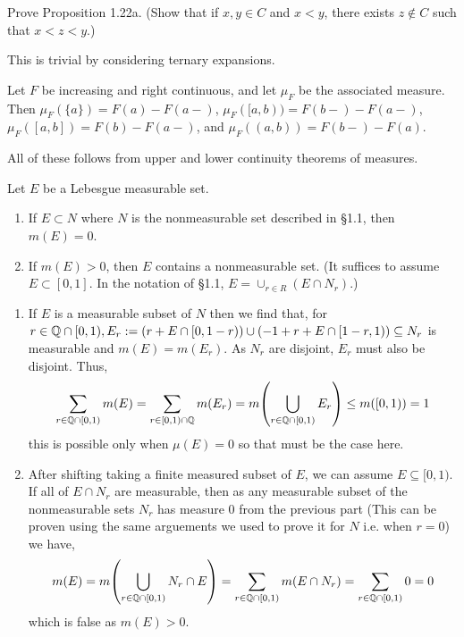 \documentclass[12pt,a4paper]{article}
\begin{document}
\begin{problem}\label{prob:1-27}
Prove Proposition 1.22a. (Show that if $x, y \in C$ and $x < y$, there exists $z \notin C$ such that $x < z < y$.)
\end{problem}
\begin{solution}
    This is trivial by considering ternary expansions.
\end{solution}
\begin{problem}\label{prob:1-28}
Let $F$ be increasing and right continuous, and let $\mu_F$ be the associated measure. Then $\mu_F(\{a\}) = F(a) - F(a-)$, $\mu_F([a, b)) = F(b-) - F(a-)$, $\mu_F([a, b]) = F(b) - F(a-)$, and $\mu_F((a, b)) = F(b-) - F(a)$.
\end{problem}
\begin{solution}
    All of these follows from upper and lower continuity theorems of measures.
\end{solution}
\begin{problem}\label{prob:1-29}
Let $E$ be a Lebesgue measurable set.
\begin{enumerate}[label=\alph*.]
    \item If $E \subset N$ where $N$ is the nonmeasurable set described in \S1.1, then $m(E) = 0$.
    \item If $m(E) > 0$, then $E$ contains a nonmeasurable set. (It suffices to assume $E \subset [0, 1]$. In the notation of \S1.1, $E = \cup_{r \in R} (E \cap N_r)$.)
\end{enumerate}
\end{problem}
\begin{solution}
    \begin{enumerate}[label=\alph*.]
        \item If $E$ is a measurable subset of $N$ then we find that, for $r\in\mathbb{Q}\cap[0,1),E_r:=(r+E\cap[0,1-r))\cup(-1+r+E\cap[1-r,1))\subseteq N_r$ is measurable and $m(E)=m(E_r)$.
        As $N_r$ are disjoint, $E_r$ must also be disjoint.
        Thus,
        $$\sum_{r\in\mathbb{Q}\cap[0,1)}m(E)=\sum_{r\in[0,1)\cap\mathbb{Q}}m(E_r)=m\qty(\bigcup_{r\in\mathbb{Q}\cap[0,1)}E_r)\leq m([0,1))=1$$ 
        this is possible only when $\mu(E)=0$ so that must be the case here. 
        \item After shifting taking a finite measured subset of $E$, we can assume $E\subseteq[0,1)$.
        If all of $E\cap N_r$ are measurable, then as any measurable subset of the nonmeasurable sets $N_r$ has measure $0$ from the previous part (This can be proven using the same arguements we used to prove it for $N$ i.e. when $r=0$) we have,
        $$m(E)=m\qty(\bigcup_{r\in\mathbb{Q}\cap[0,1)}N_r\cap E)=\sum_{r\in\mathbb{Q}\cap[0,1)}m(E\cap N_r)=\sum_{r\in\mathbb{Q}\cap[0,1)}0=0$$
        which is false as $m(E)>0$. 
    \end{enumerate}
\end{solution}
\end{document}
